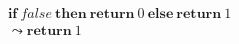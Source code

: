 \begin{equation}
    \begin{split}
        & \textbf{if}\  false \  \textbf{then} \  \textbf{return} \  0 \  \textbf{else} \  \textbf{return} \  1 \\
        & \leadsto \textbf{return}\  1
    \end{split}
\end{equation}





